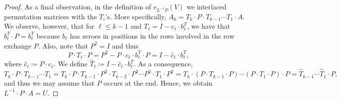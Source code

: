 \begin{proof}
    As a final observation, in the definition of $e_{L^{-1}P}(V)$ 
    we interlaced permutation matrices with the $T_i$'s. More specifically, 
    $A_k=T_k\cdot P\cdot T_{k-1}\cdots T_1\cdot A$. We observe, however, that for $\ell\leq k-1$ and
    $T_{\ell}=I-c_\ell\cdot b_\ell^T$, we have that  $b_\ell^T\cdot P=b_\ell^T$ because $b_\ell$ has zeroes in positions in the rows involved in the row exchange $P$. Also, note that  $P^2=I$ and thus 
    $$P\cdot T_\ell\cdot P=P^2-P\cdot c_\ell\cdot b_\ell^T\cdot P=I-\widehat{c}_\ell\cdot b_\ell^T,$$
where $\widehat{c}_\ell\coloneqq P\cdot c_\ell$. We define $\widehat{T}_\ell\coloneqq I-\widehat{c}_\ell\cdot b_\ell^T$.
    As a consequence,
    $$
    T_k\cdot P\cdot T_{k-1}\cdots T_1=T_k\cdot P\cdot T_{k-1}\cdot P^2\cdot T_{k-2}\cdot P^2\cdots P^2 \cdot T_1\cdot P^2=T_k\cdot (P\cdot T_{k-1}\cdot P)\cdots (P\cdot T_1\cdot P)\cdot P=\widehat{T}_{k-1}\cdots \widehat{T}_1\cdot P,
    $$
    and thus we may assume that $P$ occurs at the end. Hence, we obtain $L^{-1}\cdot P\cdot A=U$.
\end{proof}
